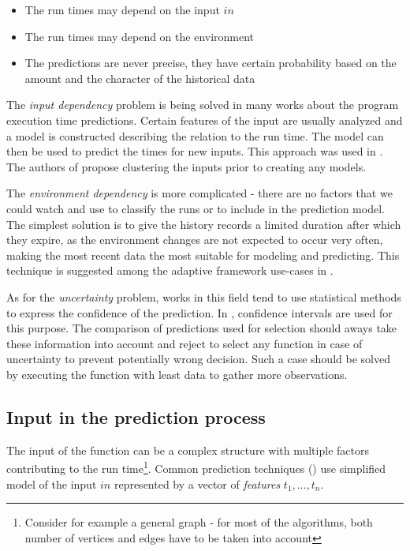 \begin{itemize}
	\item The run times may depend on the input $in$
	\item The run times may depend on the environment
	\item The predictions are never precise, they have certain probability based on the amount and the character of the historical data
\end{itemize}

The \textit{input dependency} problem is being solved in many works about the program execution time predictions. Certain features of the input are usually analyzed and a model is constructed describing the relation to the run time. The model can then be used to predict the times for new inputs. This approach was used in \cite{chun_mantis:_2010,goldsmith_measuring_2007}. The authors of \cite{smith_predicting_1998} propose clustering the inputs prior to creating any models.

The \textit{environment dependency} is more complicated - there are no factors that we could watch and use to classify the runs or to include in the prediction model. The simplest solution is to give the history records a limited duration after which they expire, as the environment changes are not expected to occur very often, making the most recent data the most suitable for modeling and predicting. This technique is suggested among the adaptive framework use-cases in \cite{bulej_performance_2012}.

As for the \textit{uncertainty} problem, works in this field tend to use statistical methods to express the confidence of the prediction. In \cite{smith_predicting_1998}, confidence intervals are used for this purpose. The comparison of predictions used for selection should aways take these information into account and reject to select any function in case of uncertainty to prevent potentially wrong decision. Such a case should be solved by executing the function with least data to gather more observations.

\subsection{Input in the prediction process}
\label{subsec:input_in_selection}

The input of the function can be a complex structure with multiple factors contributing to the run time\footnote{Consider for example a general graph - for most of the algorithms, both number of vertices and edges have to be taken into account}. Common prediction techniques (\cite{chun_mantis:_2010,goldsmith_measuring_2007}) use simplified model of the input $in$ represented by a vector of \textit{features} $t_1, \dots, t_n$. 

